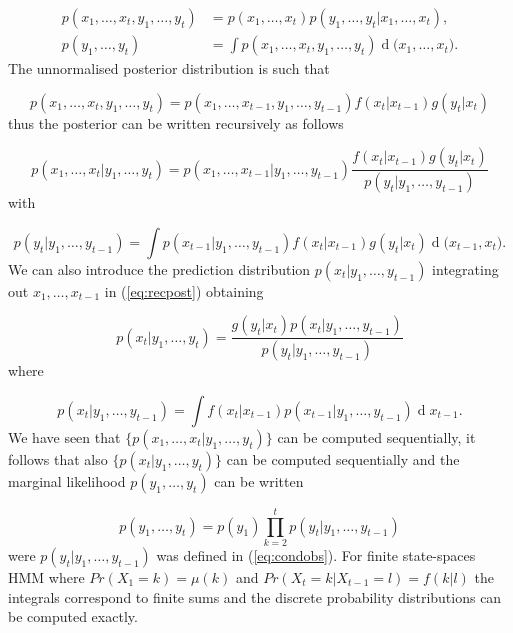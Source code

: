 \documentclass[11pt,a4paper]{article}
\renewcommand{\d}[1]{\ensuremath{\operatorname{d}\!{#1}}}
\begin{document}
\begin{align*}
    p(x_1, \dots, x_t, y_1, \dots, y_t) &= p(x_1, \dots, x_t) p(y_1, \dots, y_t | x_1, \dots, x_t), \\
    p(y_1, \dots, y_t) &= \int p(x_1, \dots, x_t, y_1, \dots, y_t) \d (x_1, \dots, x_t).
\end{align*}
The unnormalised posterior distribution is such that

\begin{equation*}
    p(x_1, \dots, x_t, y_1, \dots, y_t) = p(x_1, \dots, x_{t-1}, y_1, \dots, y_{t-1})f(x_t|x_{t-1})g(y_t|x_t)
\end{equation*}
thus the posterior can be written recursively as follows

\begin{equation} \label{eq:recpost}
    p(x_1, \dots, x_t | y_1, \dots, y_t) = p(x_1, \dots, x_{t-1}| y_1, \dots, y_{t-1})\frac{f(x_t|x_{t-1})g(y_t|x_t)}{p(y_t | y_1, \dots, y_{t-1})}
\end{equation}
with

\begin{equation} \label{eq:condobs}
    p(y_t | y_1, \dots, y_{t-1}) = \int p(x_{t-1}| y_1, \dots, y_{t-1}) f(x_t|x_{t-1})g(y_t|x_t) \d (x_{t-1}, x_t).
\end{equation}
We can also introduce the prediction distribution $p(x_t | y_1, \dots, y_{t-1})$ integrating out $x_1, \dots, x_{t-1}$ in (\ref{eq:recpost}) obtaining

\begin{equation*}
    p(x_t | y_1, \dots, y_t) = \frac{g(y_t | x_t) p(x_t | y_1, \dots, y_{t-1})}{p(y_t | y_1, \dots, y_{t-1})}
\end{equation*}
where

\begin{equation*}
    p(x_t | y_1, \dots, y_{t-1}) = \int f(x_t | x_{t-1}) p(x_{t-1} | y_1, \dots, y_{t-1}) \d x_{t-1}.
\end{equation*}
We have seen that $\{ p(x_1, \dots, x_t | y_1, \dots, y_t) \}$ can be computed sequentially, it follows that also $\{ p(x_t | y_1, \dots, y_t) \}$ can be computed sequentially and the marginal likelihood $p(y_1, \dots, y_t)$ can be written

\begin{equation*}
    p(y_1, \dots, y_t) = p(y_1)\prod_{k=2}^t p(y_t | y_1, \dots, y_{t-1})
\end{equation*}
were $p(y_t | y_1, \dots, y_{t-1})$ was defined in (\ref{eq:condobs}).
For finite state-spaces HMM where $Pr(X_1 = k) = \mu(k)$ and $Pr(X_t = k | X_{t-1} = l) = f(k|l)$ the integrals correspond to finite sums and the discrete probability distributions can be computed exactly. 
\end{document}
